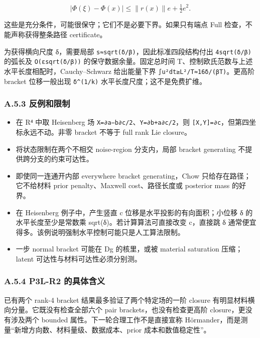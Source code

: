\documentclass[
  11pt,
  a4paper,
]{article}
\providecommand{\tightlist}{%
  \setlength{\itemsep}{0pt}\setlength{\parskip}{0pt}}
\begin{document}
\[
|\Phi(\xi)-\Phi(x)|\le\|r(x)\|e+\tfrac12e^2.\tag{G2}
\]

这些是充分条件，可能很保守；它们不是必要下界。如果只有端点 Full
检查，不能声称获得整条路径 certificate。

为获得横向尺度 δ，需要局部 \texttt{s≈sqrt(δ/β)}，因此标准四段结构付出
\texttt{4sqrt(δ/β)} 的弧长及 \texttt{O(εsqrt(δ/β))}
的保守数据余量。固定总时间
T、控制欧氏范数与上述水平长度相配时，Cauchy--Schwarz 给出能量下界
\texttt{∫\textbar{}\textbar{}u\textbar{}\textbar{}²dt≥L²/T≈16δ/(βT)}。更高阶
bracket 位移一般出现 \texttt{δ\^{}(1/k)} 水平长度尺度；这不是免费扩维。

\hypertarget{a.5.3-ux53cdux4f8bux548cux9650ux5236}{%
\subsubsection{A.5.3
反例和限制}\label{a.5.3-ux53cdux4f8bux548cux9650ux5236}}

\begin{itemize}
\tightlist
\item
  在 R⁴ 中取 Heisenberg 场 \texttt{X=∂a−b∂c/2}、\texttt{Y=∂b+a∂c/2}，则
  \texttt{{[}X,Y{]}=∂c}，但第四坐标永远不动。非零 bracket 不等于 full
  rank Lie closure。
\item
  将状态限制在两个不相交 noise-region 分支内，局部 bracket generating
  不提供跨分支的约束可达性。
\item
  即使同一连通开内部 everywhere bracket generating，Chow
  只给存在路径；它不给材料 prior penalty、Maxwell cost、路径长度或
  posterior mass 的好界。
\item
  在 Heisenberg 例子中，产生竖直 c 位移是水平投影的有向面积；小位移 δ
  的水平长度至少是常数乘 sqrt(δ)。若计算算法可直接改变 c，直接跳 δ
  通常便宜得多。该例说明强制水平控制可能只是人工算法限制。
\item
  一步 normal bracket 可能在 Dg 的核里，或被 material saturation
  压缩；latent 可达性与材料可达性必须分别测。
\end{itemize}

\hypertarget{a.5.4-p3l-r2-ux7684ux5177ux4f53ux542bux4e49}{%
\subsubsection{A.5.4 P3L-R2
的具体含义}\label{a.5.4-p3l-r2-ux7684ux5177ux4f53ux542bux4e49}}

已有两个 rank-4 bracket 结果最多验证了两个特定场的一阶 closure
有明显材料横向分量。它既没有检查全部六个 pair brackets，也没有检查更高阶
closure，更没有涉及两个 bounded 属性。下一轮合理工作不是直接宣称
Hörmander，而是测量``新增方向数、材料量级、数据成本、prior
成本和数值稳定性''。
\end{document}
